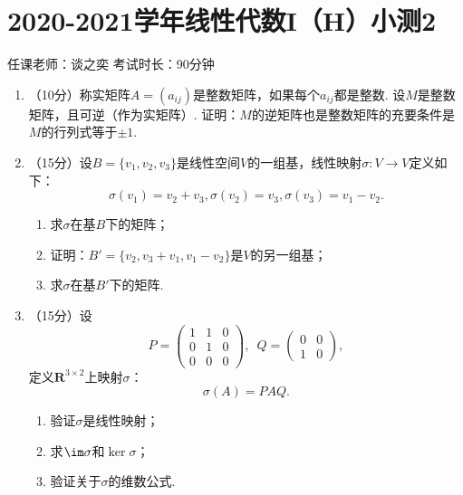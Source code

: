 \section{2020-2021学年线性代数I（H）小测2}

\begin{center}
    任课老师：谈之奕\hspace{4em} 考试时长：90分钟
\end{center}

\begin{enumerate}
    \item （10分）称实矩阵$A=(a_{ij})$是整数矩阵，如果每个$a_{ij}$都是整数. 设$M$是整数矩阵，且可逆（作为实矩阵）. 证明：$M$的逆矩阵也是整数矩阵的充要条件是$M$的行列式等于$\pm 1$.

    \item （15分）设$B=\{v_1,v_2,v_3\}$是线性空间$V$的一组基，线性映射$\sigma\colon V\to V$定义如下：
    \[\sigma(v_1)=v_2+v_3,\sigma(v_2)=v_3,\sigma(v_3)=v_1-v_2.\]
    \begin{enumerate}
        \item 求$\sigma$在基$B$下的矩阵；

        \item 证明：$B'=\{v_2,v_3+v_1,v_1-v_2\}$是$V$的另一组基；

        \item 求$\sigma$在基$B'$下的矩阵.
    \end{enumerate}

    \item （15分）设
    \[P=\begin{pmatrix}
           1 & 1 & 0 \\ 0 & 1 & 0 \\ 0 & 0 & 0
    \end{pmatrix},\enspace Q=\begin{pmatrix}
        0 & 0 \\ 1 & 0
    \end{pmatrix},\]
    定义$\mathbf{R}^{3\times 2}$上映射$\sigma$：
    \[\sigma(A)=PAQ.\]
    \begin{enumerate}
        \item 验证$\sigma$是线性映射；

        \item 求$\im\sigma$和$\ker\sigma$；

        \item 验证关于$\sigma$的维数公式.
    \end{enumerate}


\end{enumerate}
